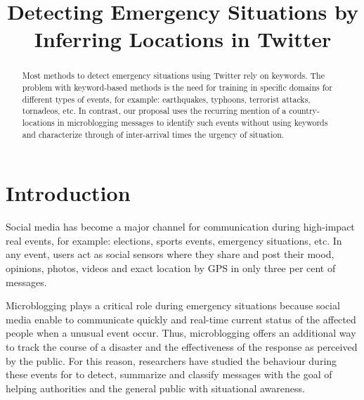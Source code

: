 \documentclass{ewic}
\begin{document}


\title{Detecting Emergency Situations by Inferring Locations in Twitter}





\begin{abstract}
Most methods to detect emergency situations using Twitter rely on keywords. The problem with keyword-based methods is the need for training in specific domains for different types of events, for example: earthquakes, typhoons, terrorist attacks, tornadeos, etc.
In contrast, our proposal uses the recurring mention of a country-locations in microblogging messages to identify such events without using keywords and characterize through of inter-arrival times the urgency of situation.
\end{abstract}


\maketitle

\section{Introduction}
Social media has become a major channel for communication during high-impact real events, for example: elections, sports events, emergency situations, etc. In any event, users act as social sensors where they share and post their mood, opinions, photos, videos and exact location by GPS in only three per cent of messages.

Microblogging plays a critical role during emergency situations because social media enable to communicate quickly and real-time current status of the affected people when a unusual event occur. Thus, microblogging offers an additional way to track the course of a disaster and the effectiveness of the response as perceived by the public. For this reason, researchers have studied the behaviour during these events for to detect, summarize and classify messages with the goal of helping authorities and the general public with situational awareness.
\end{document}
